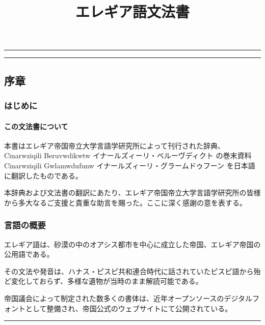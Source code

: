 \documentclass[
  japanese,
]{article}
\title{エレギア語文法書}
\author{}
\date{}
\begin{document}
\maketitle

{
\setcounter{tocdepth}{3}
\tableofcontents
}
\begin{center}\rule{0.5\linewidth}{0.5pt}\end{center}

\protect{}\label{toc-root}

\begin{center}\rule{0.5\linewidth}{0.5pt}\end{center}

\subsection{序章}\label{chapter1}

\subsubsection{はじめに}\label{section1.1}

\paragraph{この文法書について}\label{subsection1.1.1}

本書はエレギア帝国帝立大学言語学研究所によって刊行された辞典、{Cinarwziqili
Beruvwdikwtw} イナールズィーリ・ベルーヴディクト の巻末資料{Cinarwziqili
Gwlamwdufunw} イナールズィーリ・グラームドゥフーン
を日本語に翻訳したものである。

本辞典および文法書の翻訳にあたり、エレギア帝国帝立大学言語学研究所の皆様から多大なるご支援と貴重な助言を賜った。ここに深く感謝の意を表する。

\subsubsection{言語の概要}\label{section1.2}

エレギア語は、砂漠の中のオアシス都市を中心に成立した帝国、エレギア帝国の公用語である。

その文法や発音は、ハナス・ピスピ共和連合時代に話されていたピスピ語から殆ど変化しておらず、多様な遺物が当時のまま解読可能である。

帝国議会によって制定された数多くの書体は、近年オープンソースのデジタルフォントとして整備され、帝国公式のウェブサイトにて公開されている。

\begin{center}\rule{0.5\linewidth}{0.5pt}\end{center}
\end{document}
